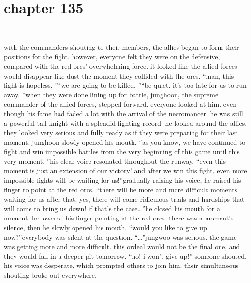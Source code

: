 \section{chapter 135}

                             




with the commanders shouting to their members, the allies began to form their positions for the fight.
 however, everyone felt they were on the defensive, compared with the red orcs’ overwhelming force.
it looked like the allied forces would disappear like dust the moment they collided with the orcs.
“man, this fight is hopeless.
”“we are going to be killed.
”“be quiet.
 it’s too late for us to run away.
”when they were done lining up for battle, junghoon, the supreme commander of the allied forces, stepped forward.
everyone looked at him.
 even though his fame had faded a lot with the arrival of the necromancer, he was still a powerful tall knight with a splendid fighting record.
he looked around the allies.
 they looked very serious and fully ready as if they were preparing for their last moment.
junghoon slowly opened his mouth.
“as you know, we have continued to fight and win impossible battles from the very beginning of this game until this very moment.
”his clear voice resonated throughout the runway.
“even this moment is just an extension of our victory! and after we win this fight, even more impossible fights will be waiting for us!”gradually raising his voice, he raised his finger to point at the red orcs.
“there will be more and more difficult moments waiting for us after that.
 yes, there will come ridiculous trials and hardships that will come to bring us down! if that’s the case…”he closed his mouth for a moment.
 he lowered his finger pointing at the red orcs.
there was a moment’s silence, then he slowly opened his mouth.
“would you like to give up now?”everybody was silent at the question.
“…”jungwoo was serious.
 the game was getting more and more difficult.
 this ordeal would not be the final one, and they would fall in a deeper pit tomorrow.
“no! i won’t give up!” someone shouted.
his voice was desperate, which prompted others to join him.
their simultaneous shouting broke out everywhere.

